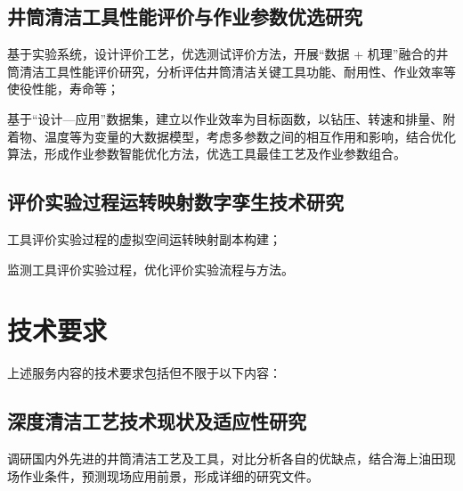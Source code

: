 \subsection{井筒清洁工具性能评价与作业参数优选研究}
\begin{circlist}
\item 基于实验系统，设计评价工艺，优选测试评价方法，开展“数据 + 机理”融合的井筒清洁工具性能评价研究，分析评估井筒清洁关键工具功能、耐用性、作业效率等使役性能，寿命等；
\item 基于“设计—应用”数据集，建立以作业效率为目标函数，以钻压、转速和排量、附着物、温度等为变量的大数据模型，考虑多参数之间的相互作用和影响，结合优化算法，形成作业参数智能优化方法，优选工具最佳工艺及作业参数组合。
\end{circlist}

\subsection{评价实验过程运转映射数字孪生技术研究}
\begin{circlist}
\item 工具评价实验过程的虚拟空间运转映射副本构建；
\item 监测工具评价实验过程，优化评价实验流程与方法。
\end{circlist}

\section{技术要求}

上述服务内容的技术要求包括但不限于以下内容：

\subsection{深度清洁工艺技术现状及适应性研究}
调研国内外先进的井筒清洁工艺及工具，对比分析各自的优缺点，结合海上油田现场作业条件，预测现场应用前景，形成详细的研究文件。

